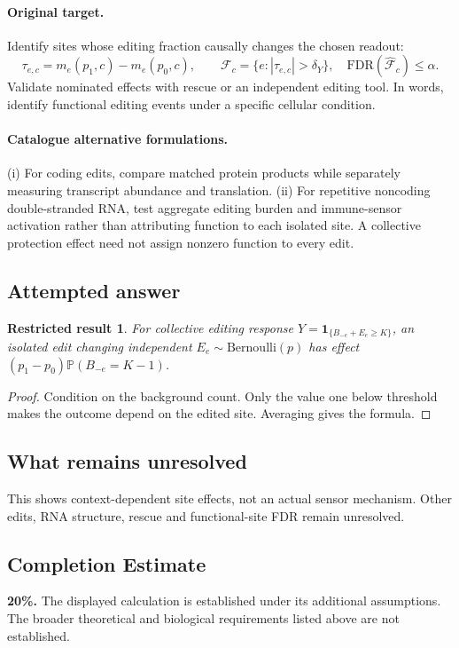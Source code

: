 \documentclass[11pt]{article}
\newcommand{\Prob}{\mathbb P}
\providecommand{\Prob}{\mathbb P}
\newtheorem{attemptresult}{Restricted result}[section]
\begin{document}
\paragraph{Original target.}
Identify sites whose editing fraction causally changes the chosen readout:
\[
\tau_{e,c}=m_e(p_1,c)-m_e(p_0,c),\qquad
\mathcal F_c=\{e:|\tau_{e,c}|>\delta_Y\},\quad
\mathrm{FDR}(\widehat{\mathcal F}_c)\leq\alpha.
\]
Validate nominated effects with rescue or an independent editing tool. In words, identify functional editing events under a specific cellular condition.
\paragraph{Catalogue alternative formulations.}
(i) For coding edits, compare matched protein products while separately measuring transcript abundance and translation. (ii) For repetitive noncoding double-stranded RNA, test aggregate editing burden and immune-sensor activation rather than attributing function to each isolated site. A collective protection effect need not assign nonzero function to every edit.
\subsection{Attempted answer}
\begin{attemptresult}
For collective editing response $Y=\mathbf1_{\{B_{-e}+E_e\geq K\}}$, an isolated edit changing independent $E_e\sim\mathrm{Bernoulli}(p)$ has effect $(p_1-p_0)\Prob(B_{-e}=K-1)$.
\end{attemptresult}
\begin{proof}
Condition on the background count. Only the value one below threshold makes the outcome depend on the edited site. Averaging gives the formula.
\end{proof}
\subsection{What remains unresolved}
This shows context-dependent site effects, not an actual sensor mechanism. Other edits, RNA structure, rescue and functional-site FDR remain unresolved.
\subsection{Completion Estimate}
\textbf{20\%.} The displayed calculation is established under its additional assumptions. The broader theoretical and biological requirements listed above are not established.
\end{document}
